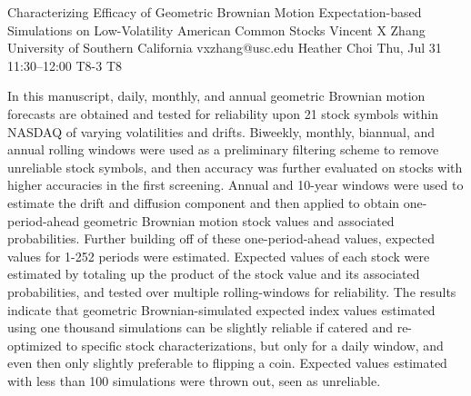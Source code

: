 \begin{talk}
  {Characterizing Efficacy of Geometric Brownian Motion Expectation-based Simulations on Low-Volatility American Common Stocks}%
  {Vincent X Zhang}%
  {University of Southern California}%
  {vxzhang@usc.edu}%
  {Heather Choi}%
  {}%
  {Thu, Jul 31 11:30–12:00}%
  {T8-3}%
  {T8}%
  
				
			
In this manuscript, daily, monthly, and annual geometric Brownian motion forecasts are obtained and tested for reliability upon 21 stock symbols within NASDAQ of varying volatilities and drifts. Biweekly, monthly, biannual, and annual rolling windows were used as a preliminary filtering scheme to remove unreliable stock symbols, and then accuracy was further evaluated on stocks with higher accuracies in the first screening. Annual and 10-year windows were used to estimate the drift and diffusion component and then applied to obtain one-period-ahead geometric Brownian motion stock values and associated probabilities. Further building off of these one-period-ahead values, expected values for 1-252 periods were estimated. Expected values of each stock were estimated by totaling up the product of the stock value and its associated probabilities, and tested over multiple rolling-windows for reliability. The results indicate that geometric Brownian-simulated expected index values estimated using one thousand simulations can be slightly reliable if catered and re-optimized to specific stock characterizations, but only for a daily window, and even then only slightly preferable to flipping a coin. Expected values estimated with less than 100 simulations were thrown out, seen as unreliable.


\medskip


\end{talk}
